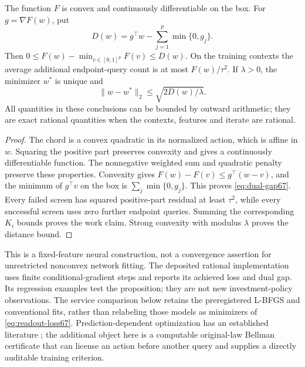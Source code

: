 \begin{proposition}\label{prop:readout67}
The function $F$ is convex and continuously differentiable on the box. For $g=\nabla F(w)$, put
\begin{equation}\label{eq:dual-gap67}
 D(w)=g^\top w-\sum_{j=1}^p\min\{0,g_j\}.
\end{equation}
Then $0\le F(w)-\min_{v\in[0,1]^p}F(v)\le D(w)$. On the training contexts the average additional endpoint-query count is at most $F(w)/\tau^2$. If $\lambda>0$, the minimizer $w^*$ is unique and
\[
 \|w-w^*\|_2\le\sqrt{2D(w)/\lambda}.
\]
All quantities in these conclusions can be bounded by outward arithmetic; they are exact rational quantities when the contexts, features and iterate are rational.
\end{proposition}
\begin{proof}
The chord is a convex quadratic in its normalized action, which is affine in $w$. Squaring the positive part preserves convexity and gives a continuously differentiable function. The nonnegative weighted sum and quadratic penalty preserve these properties. Convexity gives $F(w)-F(v)\le g^\top(w-v)$, and the minimum of $g^\top v$ on the box is $\sum_j\min\{0,g_j\}$. This proves \eqref{eq:dual-gap67}. Every failed screen has squared positive-part residual at least $\tau^2$, while every successful screen uses zero further endpoint queries. Summing the corresponding $K_i$ bounds proves the work claim. Strong convexity with modulus $\lambda$ proves the distance bound.
\end{proof}

This is a fixed-feature neural construction, not a convergence assertion for unrestricted nonconvex network fitting. The deposited rational implementation uses finite conditional-gradient steps and reports its achieved loss and dual gap. Its regression examples test the proposition; they are not new investment-policy observations. The service comparison below retains the preregistered L-BFGS and conventional fits, rather than relabeling those models as minimizers of \eqref{eq:readout-loss67}. Prediction-dependent optimization has an established literature \citep{sakaue2023warm,sambharya2023}; the additional object here is a computable original-law Bellman certificate that can license an action before another query and supplies a directly auditable training criterion.
